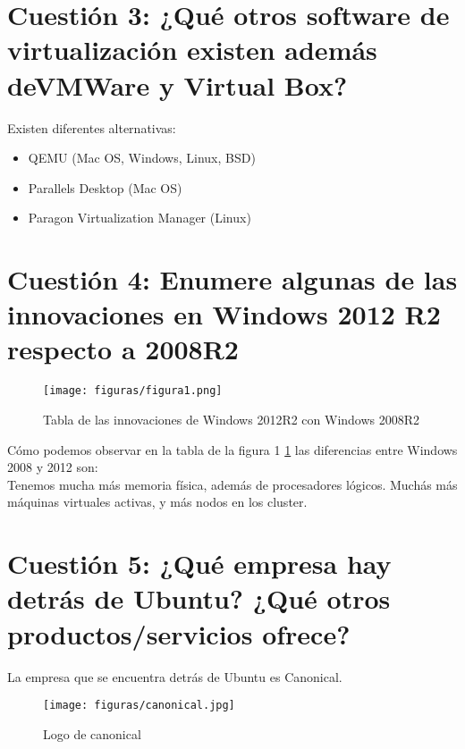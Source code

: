 \section{Cuestión 3: ¿Qué otros software de virtualización existen además deVMWare y Virtual Box?}
Existen diferentes alternativas: \cite{similar2vmw}
\begin{itemize}
	\item QEMU (Mac OS, Windows, Linux, BSD)
	\item Parallels Desktop (Mac OS)
	\item Paragon Virtualization Manager (Linux)
\end{itemize}

\section{Cuestión 4: Enumere algunas de las innovaciones en Windows 2012 R2 respecto a 2008R2 }

\begin{figure}[H] %
	\centering
	\texttt{[image: figuras/figura1.png]}  %
	\label{figura1}
	
	\caption{Tabla de las innovaciones de Windows 2012R2 con Windows 2008R2 \cite{windows2012vs2008}} 
\end{figure}

Cómo podemos observar en la tabla de la figura 1 \ref{figura1} las diferencias entre Windows 2008 y 2012 son:\\
Tenemos mucha más memoria física, además de procesadores lógicos. Muchás más máquinas virtuales activas, y más nodos en los cluster.
\section{Cuestión 5: ¿Qué empresa hay detrás de Ubuntu? ¿Qué otros productos/servicios ofrece?}
La empresa que se encuentra detrás de Ubuntu es Canonical. 
\begin{figure}[H] %
	\centering
	\texttt{[image: figuras/canonical.jpg]}  %
	\label{figura2}
	
	\caption{Logo de canonical \cite{logocano}} 
\end{figure}

